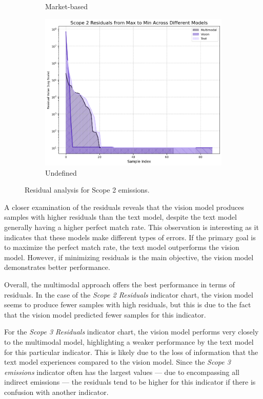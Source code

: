 \documentclass[english, 12pt, a4paper, elec, utf8, a-2b, online]{aaltothesis}
\begin{document}
\begin{figure}[H]
\begin{subfigure}[b]{0.32\textwidth}
        \caption{Market-based}
        \label{fig:scope_2_market_residual}
    \end{subfigure}
    \hfill
    \begin{subfigure}[b]{0.32\textwidth}
        \includegraphics[width=\textwidth]{images/scope2_residuals.png}
        \caption{Undefined}
        \label{fig:scope_2_residual}
    \end{subfigure}
    \caption{Residual analysis for Scope 2 emissions.}
    \label{fig:scope_2_residual_analysis}
\end{figure}

A closer examination of the residuals reveals that the vision model produces samples with higher residuals than the text model, despite the text model generally having a higher perfect match rate.
This observation is interesting as it indicates that these models make different types of errors.
If the primary goal is to maximize the perfect match rate, the text model outperforms the vision model.
However, if minimizing residuals is the main objective, the vision model demonstrates better performance.

Overall, the multimodal approach offers the best performance in terms of residuals.
In the case of the \textit{Scope 2 Residuals} indicator chart, the vision model seems to produce fewer samples with high residuals, but this is due to the fact that the vision model predicted fewer samples for this indicator.

For the \textit{Scope 3 Residuals} indicator chart, the vision model performs very closely to the multimodal model, highlighting a weaker performance by the text model for this particular indicator.
This is likely due to the loss of information that the text model experiences compared to the vision model.
Since the \textit{Scope 3 emissions} indicator often has the largest values --- due to encompassing all indirect emissions --- the residuals tend to be higher for this indicator if there is confusion with another indicator.
\end{document}
